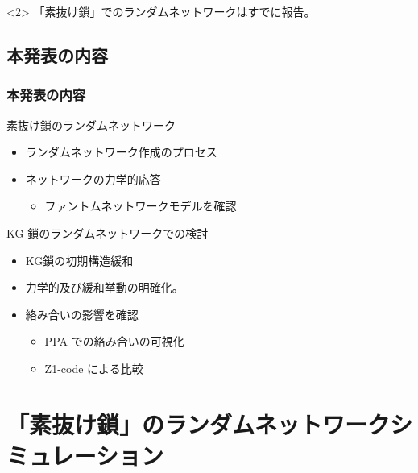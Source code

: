 \documentclass[12pt, dvipdfmx]{beamer}
\begin{document}
\begin{frame}
\begin{columns}[totalwidth=1\textwidth]
    \end{columns}
    \vspace{-3mm}
	\begin{center}
		\begin{alertblock}<2>{}
			\alert{「素抜け鎖」でのランダムネットワークはすでに報告。}
		\end{alertblock}
	\end{center}
\end{frame}

\subsection{本発表の内容}
\begin{frame}
	\frametitle{本発表の内容}
		\begin{block}{素抜け鎖のランダムネットワーク}
			\begin{itemize}
				\item ランダムネットワーク作成のプロセス
				\item ネットワークの力学的応答
				\begin{itemize}
					\item \alert{ファントムネットワークモデル}を確認
				\end{itemize}
			\end{itemize}
		\end{block}
		\begin{alertblock}{KG 鎖のランダムネットワークでの検討}
			\begin{itemize}
				\item KG鎖の初期構造緩和
				\item 力学的及び緩和挙動の明確化。
				\item 絡み合いの影響を確認
				\begin{itemize}
					\item PPA での絡み合いの可視化
					\item Z1-code による比較
				\end{itemize}
			\end{itemize}
		\end{alertblock}
\end{frame}


\section{「素抜け鎖」のランダムネットワークシミュレーション}
\end{document}

